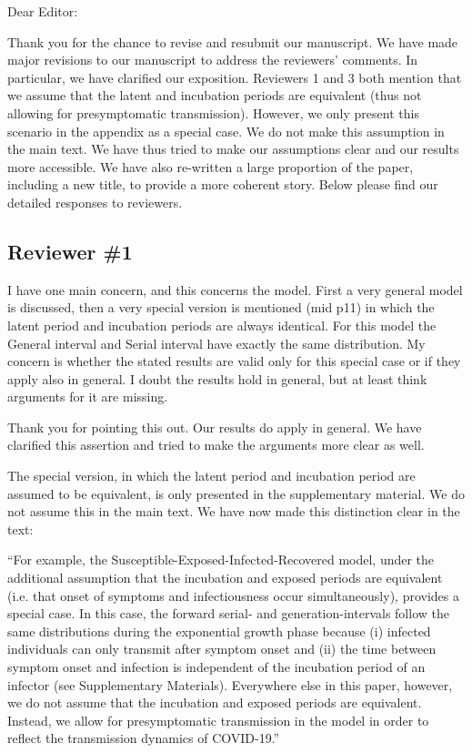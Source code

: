 \documentclass[12pt]{article}
\newcommand{\rev}{\subsection*}
\newcommand{\revtext}{\textsf}
\begin{document}
\noindent Dear Editor:

Thank you for the chance to revise and resubmit our manuscript. 
We have made major revisions to our manuscript to address the reviewers' comments.
In particular, we have clarified our exposition.
Reviewers 1 and 3 both mention that we assume that the latent and incubation periods are equivalent (thus not allowing for presymptomatic transmission). 
However, we only present this scenario in the appendix as a special case.
We do not make this assumption in the main text.
We have thus tried to make our assumptions clear and our results more accessible.
We have also re-written a large proportion of the paper, including a new title, to provide a more coherent story.
Below please find our detailed responses to reviewers.

\rev{Reviewer \#1}

\revtext{I have one main concern, and this concerns the model. First a very general model is discussed, then a very special version is mentioned (mid p11) in which the latent period and incubation periods are always identical. For this model the General interval and Serial interval have exactly the same distribution. My concern is whether the stated results are valid only for this special case or if they apply also in general. I doubt the results hold in general, but at least think arguments for it are missing.}

Thank you for pointing this out. Our results do apply in general. We have clarified this assertion and tried to make the arguments more clear as well.

The special version, in which the latent period and incubation period are assumed to be equivalent, is only presented in the supplementary material. We do not assume this in the main text. We have now made this distinction clear in the text:

``For example, the Susceptible-Exposed-Infected-Recovered model, under the additional assumption that the incubation and exposed periods are equivalent (i.e. that onset of symptoms and infectiousness occur simultaneously), provides a special case.
In this case, the forward serial- and generation-intervals follow the same distributions during the exponential growth phase because (i) infected individuals can only transmit after symptom onset and (ii) the time between symptom onset and infection is independent of the incubation period of an infector (see Supplementary Materials).
Everywhere else in this paper, however, we do not assume that the incubation and exposed periods are equivalent.
Instead, we allow for presymptomatic transmission in the model in order to reflect the transmission dynamics of COVID-19.''
\end{document}
